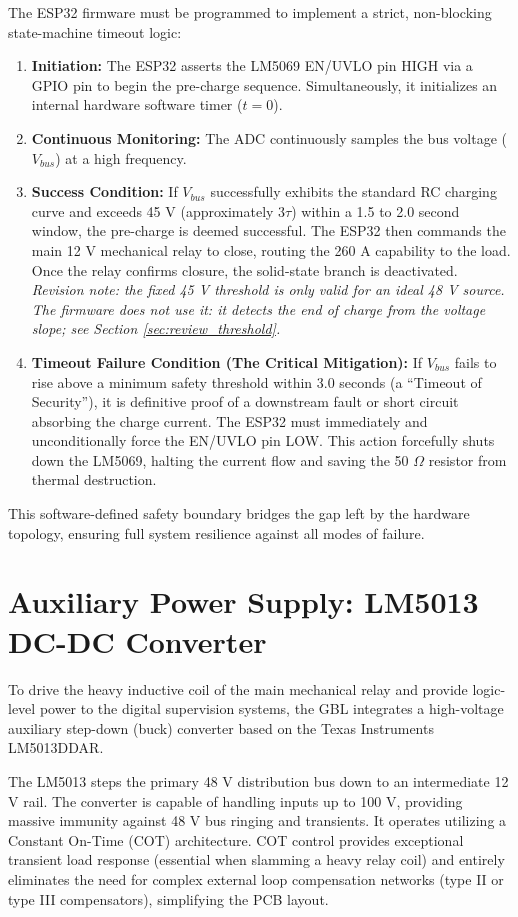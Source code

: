 \documentclass[11pt,a4paper]{article}
\begin{document}
The ESP32 firmware must be programmed to implement a strict, non-blocking state-machine timeout logic:
\begin{enumerate}
    \item \textbf{Initiation:} The ESP32 asserts the LM5069 EN/UVLO pin HIGH via a GPIO pin to begin the pre-charge sequence. Simultaneously, it initializes an internal hardware software timer ($t=0$).
    \item \textbf{Continuous Monitoring:} The ADC continuously samples the bus voltage ($V_{bus}$) at a high frequency.
    \item \textbf{Success Condition:} If $V_{bus}$ successfully exhibits the standard RC charging curve and exceeds 45 V (approximately $3\tau$) within a 1.5 to 2.0 second window, the pre-charge is deemed successful. The ESP32 then commands the main 12 V mechanical relay to close, routing the 260 A capability to the load. Once the relay confirms closure, the solid-state branch is deactivated. \textit{Revision note: the fixed 45 V threshold is only valid for an ideal 48 V source. The firmware does not use it: it detects the end of charge from the voltage slope; see Section \ref{sec:review_threshold}.}
    \item \textbf{Timeout Failure Condition (The Critical Mitigation):} If $V_{bus}$ fails to rise above a minimum safety threshold within 3.0 seconds (a ``Timeout of Security''), it is definitive proof of a downstream fault or short circuit absorbing the charge current. The ESP32 must immediately and unconditionally force the EN/UVLO pin LOW. This action forcefully shuts down the LM5069, halting the current flow and saving the 50 $\Omega$ resistor from thermal destruction.
\end{enumerate}
This software-defined safety boundary bridges the gap left by the hardware topology, ensuring full system resilience against all modes of failure.

\section{Auxiliary Power Supply: LM5013 DC-DC Converter}
\label{sec:LM5013}

To drive the heavy inductive coil of the main mechanical relay and provide logic-level power to the digital supervision systems, the GBL integrates a high-voltage auxiliary step-down (buck) converter based on the Texas Instruments LM5013DDAR. 

The LM5013 steps the primary 48 V distribution bus down to an intermediate 12 V rail. The converter is capable of handling inputs up to 100 V, providing massive immunity against 48 V bus ringing and transients. It operates utilizing a Constant On-Time (COT) architecture. COT control provides exceptional transient load response (essential when slamming a heavy relay coil) and entirely eliminates the need for complex external loop compensation networks (type II or type III compensators), simplifying the PCB layout.
\end{document}
